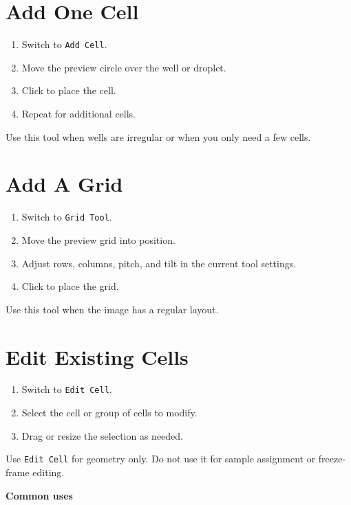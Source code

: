 \documentclass[
  9pt,
  letterpaper,
  oneside,
  open=any,
  DIV=15,
  parskip=half-,
  headings=big,
  numbers=noenddot
]{scrbook}
\newcommand{\manuallead}[1]{%
  \vspace{0.15em}%
  {\sffamily\bfseries\color{ManualBlue}#1}\par\nobreak\vspace{0.05em}%
}
\begin{document}
\section{Add One Cell}

\begin{enumerate}[leftmargin=*,itemsep=0.35em,topsep=0.4em]
\item Switch to \texttt{Add Cell}.
\item Move the preview circle over the well or droplet.
\item Click to place the cell.
\item Repeat for additional cells.
\end{enumerate}

Use this tool when wells are irregular or when you only need a few cells.


\section{Add A Grid}

\begin{enumerate}[leftmargin=*,itemsep=0.35em,topsep=0.4em]
\item Switch to \texttt{Grid Tool}.
\item Move the preview grid into position.
\item Adjust rows, columns, pitch, and tilt in the current tool settings.
\item Click to place the grid.
\end{enumerate}

Use this tool when the image has a regular layout.


\section{Edit Existing Cells}

\begin{enumerate}[leftmargin=*,itemsep=0.35em,topsep=0.4em]
\item Switch to \texttt{Edit Cell}.
\item Select the cell or group of cells to modify.
\item Drag or resize the selection as needed.
\end{enumerate}

Use \texttt{Edit Cell} for geometry only. Do not use it for sample assignment or freeze-frame editing.


\manuallead{Common uses}
\end{document}
